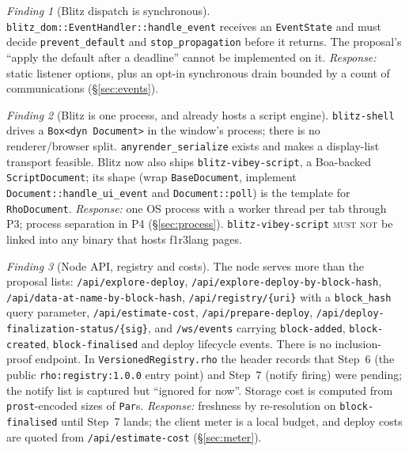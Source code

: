 \documentclass[11pt]{article}
\theoremstyle{definition}
\theoremstyle{remark}
\newcommand{\fl}{f1r3lang}
\newcommand{\MUSTNOT}{\textsc{must not}}
\newcommand{\code}[1]{\texttt{#1}}
\newtheorem{finding}{Finding}
\begin{document}
\begin{finding}[Blitz dispatch is synchronous]\label{f:sync}
\code{blitz\_dom::EventHandler::handle\_event} receives an \code{EventState} and must
decide \code{prevent\_default} and \code{stop\_propagation} before it returns. The
proposal's ``apply the default after a deadline'' cannot be implemented on it.
\emph{Response:} static listener options, plus an opt-in synchronous drain bounded
by a count of communications (\S\ref{sec:events}).
\end{finding}

\begin{finding}[Blitz is one process, and already hosts a script engine]\label{f:blitz}
\code{blitz-shell} drives a \code{Box<dyn Document>} in the window's process;
there is no renderer/browser split. \code{anyrender\_serialize} exists and makes a
display-list transport feasible. Blitz now also ships \code{blitz-vibey-script}, a
Boa-backed \code{ScriptDocument}; its shape (wrap \code{BaseDocument}, implement
\code{Document::handle\_ui\_event} and \code{Document::poll}) is the template for
\code{RhoDocument}. \emph{Response:} one OS process with a worker thread per tab
through P3; process separation in P4 (\S\ref{sec:process}). \code{blitz-vibey-script}
\MUSTNOT{} be linked into any binary that hosts \fl{} pages.
\end{finding}

\begin{finding}[Node API, registry and costs]\label{f:node}
The node serves more than the proposal lists: \code{/api/explore-deploy},
\code{/api/explore-deploy-by-block-hash}, \code{/api/data-at-name-by-block-hash},
\code{/api/registry/\{uri\}} with a \code{block\_hash} query parameter,
\code{/api/estimate-cost}, \code{/api/prepare-deploy},
\code{/api/deploy-finalization-status/\{sig\}}, and \code{/ws/events} carrying
\code{block-added}, \code{block-created}, \code{block-finalised} and deploy
lifecycle events. There is no inclusion-proof endpoint. In
\code{VersionedRegistry.rho} the header records that Step~6 (the public
\code{rho:registry:1.0.0} entry point) and Step~7 (notify firing) were pending; the
notify list is captured but ``ignored for now''. Storage cost is computed from
\code{prost}-encoded sizes of \code{Par}s. \emph{Response:} freshness by
re-resolution on \code{block-finalised} until Step~7 lands; the client meter is a
local budget, and deploy costs are quoted from \code{/api/estimate-cost}
(\S\ref{sec:meter}).
\end{finding}
\end{document}
